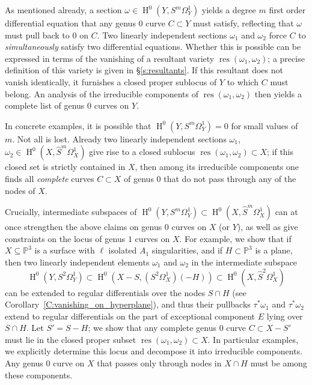 \documentclass[12pt, reqno]{amsart}
\theoremstyle{definition}
\newcommand{\PP}{{\mathbb P}}
\DeclareMathOperator{\HH}{H}
\DeclareMathOperator{\res}{res}
\numberwithin{equation}{section}
\numberwithin{table}{section}
\begin{document}
As mentioned already, a section $\omega\in \HH^0(Y,S^m\Omega^1_Y)$ yields a degree $m$ first order differential equation that any genus $0$ curve $C\subset Y$ must satisfy, reflecting that $\omega$ must pull back to $0$ on $C$.  Two linearly independent sections $\omega_1$ and $\omega_2$ force $C$ to \emph{simultaneously} satisfy two differential equations. Whether this is possible can be expressed in terms of the vanishing of a resultant variety $\res(\omega_1,\omega_2)$; a precise definition of this variety is given in \S\ref{s:resultants}. If this resultant does not vanish identically, it furnishes a closed proper sublocus of $Y$ to which $C$ must belong.  An analysis of the irreducible components of $\res(\omega_1,\omega_2)$ then yields a complete list of genus $0$ curves on $Y$.

In concrete examples, it is possible that $\HH^0(Y,S^m\Omega^1_Y) = 0$ for small values of $m$.  Not all is lost.  Already two linearly independent sections $\omega_1$, $\omega_2\in \HH^0(X,\hat{S}^m\Omega^1_X)$ give rise to a closed sublocus $\res(\omega_1,\omega_2) \subset X$; if this closed set is strictly contained in $X$, then among its irreducible components one finds all \emph{complete} curves $C \subset X$ of genus $0$ that do not pass through any of the nodes of $X$.  

Crucially, intermediate subspaces of $\HH^0(Y,S^m\Omega^1_Y) \subset \HH^0(X,\hat{S}^m\Omega^1_X)$ can at once strengthen the above claims on genus $0$ curves on $X$ (or $Y$), as well as give constraints on the locus of genus $1$ curves on $X$.  For example, we show that if $X \subseteq \PP^3$ is a surface with $\ell$ isolated $A_1$ singularities, and if $H \subset \PP^3$ is a plane, then two linearly independent elements $\omega_1$ and $\omega_2$ in the intermediate subspace 
\[
\HH^0(Y,S^2\Omega^1_Y) \subset \HH^0\left(X - S,(S^2\Omega^1_X)(-H)\right) \subset \HH^0(X,\hat{S}^2\Omega^1_X)
\]
can be extended to regular differentials over the nodes $S\cap H$ (see Corollary~\ref{C:vanishing_on_hyperplane}), and thus their pullbacks $\tau^*\omega_1$ and $\tau^*\omega_2$ extend to regular differentials on the part of exceptional component $E$ lying over $S\cap H$. Let $S' = S - H$; we show that any complete genus $0$ curve $C\subset X - S'$ must lie in the closed proper subset $\res(\omega_1,\omega_2) \subset X$. In particular examples, we explicitly determine this locus and decompose it into irreducible components. Any genus $0$ curve on $X$ that passes only through nodes in $X\cap H$ must be among these components.
\end{document}
